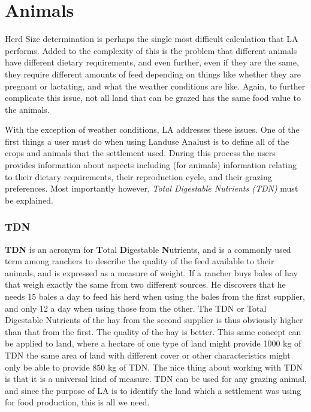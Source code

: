   \section{Animals}
  Herd Size determination is perhaps the single most difficult calculation that
  LA performs.  Added to the complexity of this is the problem that different
  animals have different dietary requirements, and even further, even if they
  are the same, they require different amounts of feed depending on things like
  whether they are pregnant or lactating, and what the weather conditions are
  like.  Again, to further complicate this issue, not all land that can be
  grazed has the same food value to the animals.

  With the exception of weather conditions, LA addresses these issues.  One of
  the first things a user must do when using Landuse Analust is to define all
  of the crops and animals that the settlement used.  During this process the
  users provides information about aspects including (for animals) information
  relating to their dietary requirements, their reproduction cycle, and their
  grazing preferences.  Most importantly however, \textit{Total Digestable
  Nutrients (TDN)} must be explained.

    \subsubsection{TDN}
      \label{TDN}
    \textbf{TDN} is an acronym for \textbf{T}otal \textbf{D}igestable
    \textbf{N}utrients, and is a commonly used term among ranchers to describe
    the quality of the feed available to their animals, and is expressed as a
    measure of weight. If a rancher buys bales of hay that weigh exactly the
    same from two different sources.  He discovers that he needs 15 bales a day
    to feed his herd when using the bales from the first supplier, and only 12
    a day when using those from the other.  The TDN or Total Digestable
    Nutrients of the hay from the second supplier is thus obviously higher than
    that from the first.  The quality of the hay is better.  This same concept
    can be applied to land, where a hectare of one type of land might provide
    1000 kg of TDN the same area of land with different cover or other
    characteristics might only be able to provide $850$ kg of TDN.  The nice
    thing about working with TDN is that it is a universal kind of measure.
    TDN can be used for any grazing animal, and since the purpose of LA is to
    identify the land which a settlement was using for food production, this is
    all we need.


